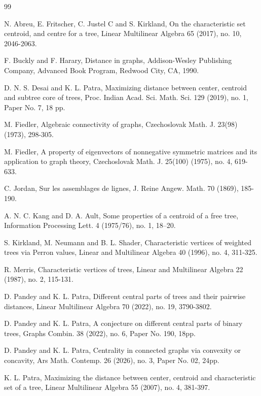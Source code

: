 \documentclass[11pt]{article}
\begin{document}
\begin{thebibliography}{99}

 N. Abreu, E. Fritscher, C. Justel C and S. Kirkland, On the characteristic set centroid, and centre for a tree,
Linear Multilinear Algebra 65 (2017), no. 10, 2046-2063.

 F. Buckly and F. Harary, Distance in graphs, Addison-Wesley Publishing Company, Advanced Book Program, Redwood City, CA, 1990.

 D. N. S. Desai and K. L. Patra, Maximizing distance between center, centroid and subtree core of trees, Proc. Indian Acad. Sci. Math. Sci. 129 (2019), no. 1, Paper No. 7, 18 pp.

 M. Fiedler, Algebraic connectivity of graphs, Czechoslovak Math. J. 23(98) (1973), 298-305.

 M. Fiedler,  A property of eigenvectors of nonnegative symmetric matrices and its application to graph theory, Czechoslovak Math. J. 25(100) (1975), no. 4, 619-633.

 C. Jordan, Sur les assemblages de lignes, J. Reine Angew. Math. 70 (1869), 185-190. 

 A. N. C. Kang and D. A. Ault, Some properties of a centroid of a free tree, Information Processing Lett. 4 (1975/76), no. 1, 18–20.

 S. Kirkland, M. Neumann and B. L. Shader,  Characteristic vertices  of weighted trees via Perron values, Linear and Multilinear Algebra 40 (1996), no. 4, 311-325.

 R. Merris, Characteristic vertices of trees, Linear and Multilinear  Algebra 22 (1987), no. 2, 115-131.

 D. Pandey and K. L. Patra,  Different central parts of trees and their pairwise distances, Linear Multilinear Algebra 70 (2022), no. 19, 3790-3802.

 D. Pandey and K. L. Patra, A conjecture on different central parts of binary trees, Graphs Combin. 38 (2022), no. 6, Paper No. 190, 18pp.

 D. Pandey and K. L. Patra, Centrality in connected graphs via convexity or concavity, Ars Math. Contemp. 26 (2026), no. 3, Paper No. 02, 24pp.

 K. L. Patra, Maximizing the distance between center, centroid and characteristic set of a tree, Linear Multilinear Algebra 55 (2007), no. 4, 381-397.


\end{thebibliography}
\end{document}
